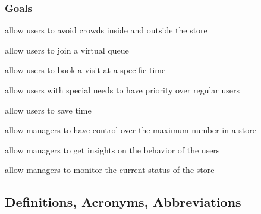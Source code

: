 \subsubsection{Goals}
\begin{enumerate}[label={[G\arabic*]}]
    \item allow users to avoid crowds inside and outside the store
    \begin{enumerate}[label={[G1.\arabic*]}]
        \item allow users to join a virtual queue
        \item allow users to book a visit at a specific time
    \end{enumerate}
    \item allow users with special needs to have priority over regular users
    \item allow users to save time
    \item allow managers to have control over the maximum number in a store
    \item allow managers to get insights on the behavior of the users
    \item allow managers to monitor the current status of the store
\end{enumerate}

\subsection{Definitions, Acronyms, Abbreviations}

